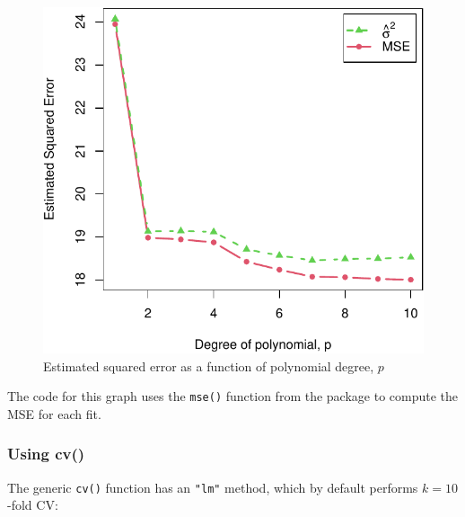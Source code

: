 \documentclass[
]{jss}
\begin{document}
\begin{CodeChunk}
\begin{figure}
{\centering \includegraphics[width=1\linewidth]{JSS-article-reduced_files/figure-latex/mpg-horsepower-MSE-se-1} 

}

\caption[Estimated squared error as a function of polynomial degree, $p$]{Estimated squared error as a function of polynomial degree, $p$}\label{fig:mpg-horsepower-MSE-se}
\end{figure}
\end{CodeChunk}

The code for this graph uses the \texttt{mse()} function from the
 package to compute the MSE for each fit.

\hypertarget{using-cv}{%
\subsubsection{Using cv()}\label{using-cv}}

The generic \texttt{cv()} function has an \texttt{"lm"} method, which by
default performs \(k = 10\)-fold CV:
\end{document}
